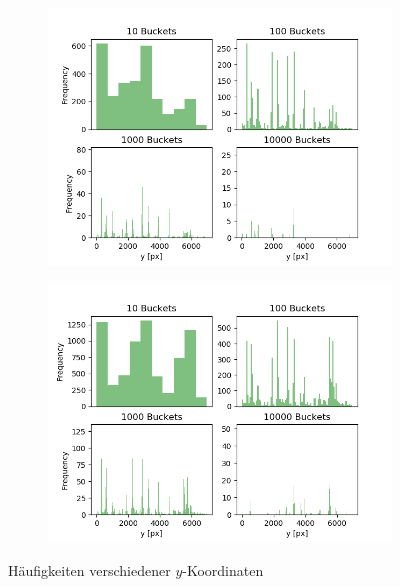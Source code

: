 \vspace*{-0.6cm}
\begin{figure}[H]
\centering
	\begin{subfigure}[t]{0.47\textwidth}
	\begin{flushright}
		\includegraphics[scale=0.5]{Bilder/y_distribution_v1.png}
	\end{flushright}	\end{subfigure}
	\begin{subfigure}[t]{0.47\textwidth}
\begin{flushleft}
		\includegraphics[scale=0.5]{Bilder/y_distribution_v2.png}
	\end{flushleft}
	\end{subfigure}
\caption{Häufigkeiten verschiedener $y$-Koordinaten}
\end{figure}